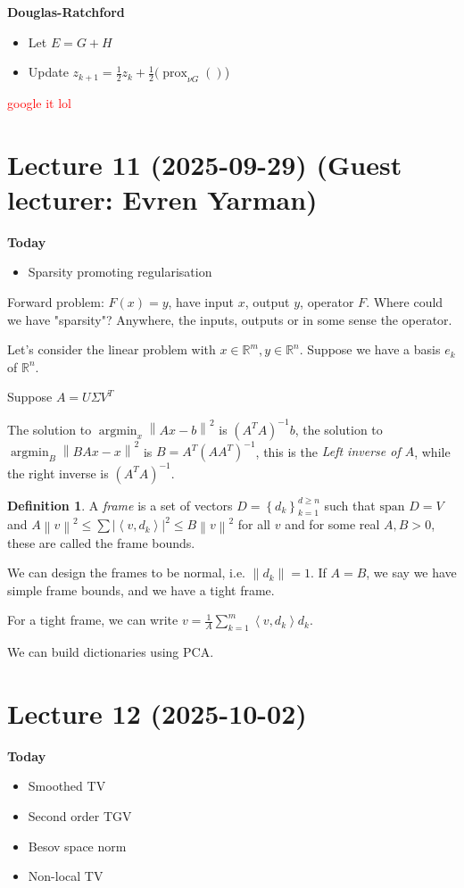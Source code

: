 \documentclass[12pt]{article}
\theoremstyle{definition}
\newtheorem{definition}{Definition}[section]
\newcommand{\real}{\mathbb{R}}   %
\newcommand{\abs}[1]{\left|#1\right|}
\newcommand{\set}[1]{\left\{#1\right\}}
\DeclareMathOperator{\argmin}{argmin}
\DeclareMathOperator{\prox}{prox}
\newcommand\norm[1]{\left\lVert#1\right\rVert}
\newcommand\inner[2]{\left\langle#1, #2\right\rangle}
\begin{document}
\textbf{Douglas-Ratchford}
\begin{itemize}
    \item Let $E=G+H$
    \item Update $z_{k+1} = \frac{1}{2}z_k + \frac{1}{2}(\prox_{\nu G}()$)
\end{itemize}

\textcolor{red}{google it lol}


\newpage
\section{Lecture 11 (2025-09-29) (Guest lecturer: Evren Yarman)}
\textbf{Today}
\begin{itemize}
    \item Sparsity promoting regularisation
\end{itemize}

Forward problem: $F(x)=y$, have input $x$, output $y$, operator $F$. Where could we have "sparsity"? Anywhere, the inputs, outputs or in some sense the operator.

Let's consider the linear problem with $x\in\real^m,y\in\real^n$. Suppose we have a basis ${e_k}$ of $\real^n$. 

Suppose $A= U\Sigma V^T$

The solution to $\argmin_x \norm{Ax-b}^2$ is $(A^TA)^{-1}b$, the solution to $\argmin_B \norm{BAx-x}^2$ is $B=A^T(AA^T)^{-1}$, this is the \textit{Left inverse of $A$}, while the right inverse is $(A^TA)^{-1}$.

\begin{definition}
    A \textit{frame} is a set of vectors $D=\set{d_k}_{k=1}^{d\geq n}$ such that $  \text{span } D = V$ and $A\norm{v}^2\leq \sum \abs{\inner{v}{d_k}}^2 \leq B\norm{v}^2$ for all $v$ and for some real $A,B>0$, these are called the frame bounds.
\end{definition}

We can design the frames to be normal, i.e. $\norm{d_k}=1$. If $A=B$, we say we have simple frame bounds, and we have a tight frame.

For a tight frame, we can write $v=\frac{1}{A}\sum_{k=1}^m \inner{v}{d_k}d_k$. 

We can build dictionaries using PCA.


\newpage
\section{Lecture 12 (2025-10-02)}
\textbf{Today}
\begin{itemize}
    \item Smoothed TV
    \item Second order TGV
    \item Besov space norm
    \item Non-local TV
\end{itemize}
\end{document}
